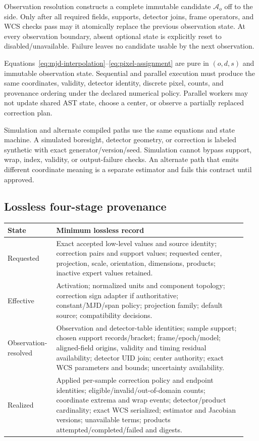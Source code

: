 \documentclass[11pt]{article}
\begin{document}
Observation resolution constructs a complete immutable candidate
$\mathcal A_o$ off to the side.  Only after all required fields, supports,
detector joins, frame operators, and WCS checks pass may it atomically replace
the previous observation state.  At every observation boundary, absent
optional state is explicitly reset to disabled/unavailable.  Failure leaves no
candidate usable by the next observation.

Equations~\eqref{eq:mjd-interpolation}--\eqref{eq:pixel-assignment} are pure in
$(o,d,s)$ and immutable observation state.  Sequential and parallel execution
must produce the same coordinates, validity, detector identity, discrete
pixel, counts, and provenance ordering under the declared numerical policy.
Parallel workers may not update shared AST state, choose a center, or observe a
partially replaced correction plan.

Simulation and alternate compiled paths use the same equations and state
machine.  A simulated boresight, detector geometry, or correction is labeled
synthetic with exact generator/version/seed.  Simulation cannot bypass
support, wrap, index, validity, or output-failure checks.  An alternate path
that emits different coordinate meaning is a separate estimator and fails
this contract until approved.

\subsection{Lossless four-stage provenance}

\begin{longtable}{>{\raggedright\arraybackslash}p{0.18\linewidth}
                  >{\raggedright\arraybackslash}p{0.76\linewidth}}
\toprule
State & Minimum lossless record \\
\midrule
\endhead
Requested & Exact accepted low-level values and source identity; correction
pairs and support values; requested center, projection, scale, orientation,
dimensions, products; inactive expert values retained. \\
Effective & Activation; normalized units and component topology; correction
sign adapter if authoritative; constant/MJD/span policy; projection family;
default source; compatibility decisions. \\
Observation-resolved & Observation and detector-table identities; sample
support; chosen support records/bracket; frame/epoch/model; aligned-field
origins, validity and timing residual availability; detector UID join; center
authority; exact WCS parameters and bounds; uncertainty availability. \\
Realized & Applied per-sample correction policy and endpoint identities;
eligible/invalid/out-of-domain counts; coordinate extrema and wrap events;
detector/product cardinality; exact WCS serialized; estimator and Jacobian
versions; unavailable terms; products attempted/completed/failed and digests.
\\
\bottomrule
\end{longtable}
\end{document}
